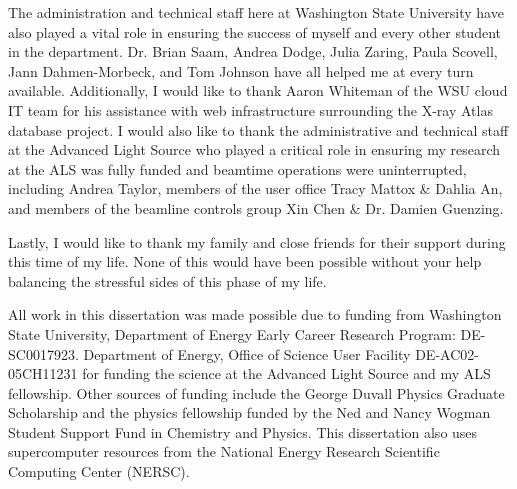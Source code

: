The administration and technical staff here at Washington State University have also played a vital role in ensuring the success of myself and every other student in the department. Dr. Brian Saam, Andrea Dodge, Julia Zaring, Paula Scovell, Jann Dahmen-Morbeck, and Tom Johnson have all helped me at every turn available. Additionally, I would like to thank Aaron Whiteman of the WSU cloud IT team for his assistance with web infrastructure surrounding the X-ray Atlas database project. I would also like to thank the administrative and technical staff at the Advanced Light Source who played a critical role in ensuring my research at the ALS was fully funded and beamtime operations were uninterrupted, including Andrea Taylor, members of the user office Tracy Mattox \& Dahlia An, and members of the beamline controls group Xin Chen \& Dr. Damien Guenzing.

Lastly, I would like to thank my family and close friends for their support during this time of my life. None of this would have been possible without your help balancing the stressful sides of this phase of my life.

All work in this dissertation was made possible due to funding from Washington State University, Department of Energy Early Career Research Program: DE-SC0017923. Department of Energy, Oﬃce of Science User Facility DE-AC02-05CH11231 for funding the science at the Advanced Light Source and my ALS fellowship. Other sources of funding include the George Duvall Physics Graduate Scholarship and the physics fellowship funded by the Ned and Nancy Wogman Student Support Fund in Chemistry and Physics. This dissertation also uses supercomputer resources from the National Energy Research Scientific Computing Center (NERSC).
